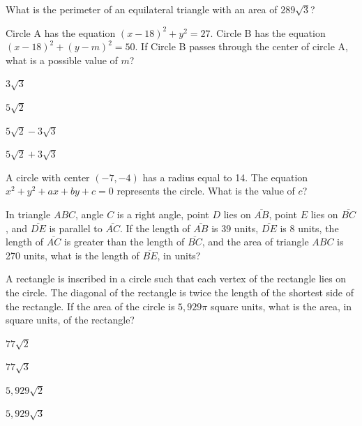 \vfill
\clearpage
\noindent\begin{minipage}{\linewidth}
\par\smallskip
What is the perimeter of an equilateral triangle with an area of $289\sqrt{3}$?
\end{minipage}
\vfill
\noindent\begin{minipage}{\linewidth}
\par\smallskip
Circle A has the equation $(x-18)^2+y^2=27$. Circle B has the equation $(x-18)^2+(y-m)^2=50$. If Circle B passes through the center of circle A, what is a possible value of $m$?
\begin{satchoices}
  \item[A)] $3\sqrt{3}$
  \item[B)] $5\sqrt{2}$
  \item[C)] $5\sqrt{2}-3\sqrt{3}$
  \item[D)] $5\sqrt{2}+3\sqrt{3}$
\end{satchoices}
\end{minipage}
\vfill
\noindent\begin{minipage}{\linewidth}
\par\smallskip
A circle with center $(-7,-4)$ has a radius equal to 14. The equation $x^2+y^2+ax+by+c=0$ represents the circle. What is the value of $c$?
\end{minipage}
\vfill
\clearpage
\noindent\begin{minipage}{\linewidth}
\par\smallskip
In triangle $ABC$, angle $C$ is a right angle, point $D$ lies on $\overline{AB}$, point $E$ lies on $\overline{BC}$, and $\overline{DE}$ is parallel to $\overline{AC}$. If the length of $\overline{AB}$ is 39 units, $\overline{DE}$ is 8 units, the length of $\overline{AC}$ is greater than the length of $\overline{BC}$, and the area of triangle $ABC$ is 270 units, what is the length of $\overline{BE}$, in units?
\end{minipage}
\vfill
\noindent\begin{minipage}{\linewidth}
\par\smallskip
A rectangle is inscribed in a circle such that each vertex of the rectangle lies on the circle. The diagonal of the rectangle is twice the length of the shortest side of the rectangle. If the area of the circle is $5{,}929\pi$ square units, what is the area, in square units, of the rectangle?
\begin{satchoices}
  \item[A)] $77\sqrt{2}$
  \item[B)] $77\sqrt{3}$
  \item[C)] $5{,}929\sqrt{2}$
  \item[D)] $5{,}929\sqrt{3}$
\end{satchoices}
\end{minipage}
